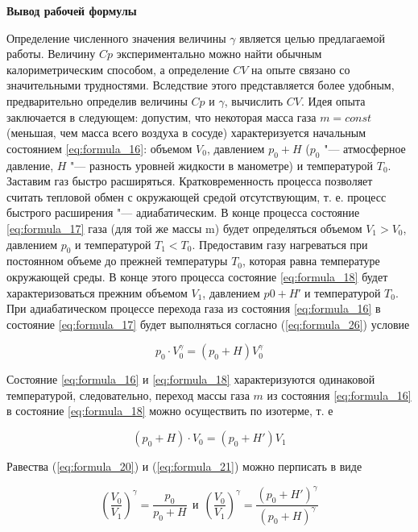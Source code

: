 \begin{center}
    \textbf{Вывод рабочей формулы}
\end{center}

Определение численного значения величины $\gamma$ является целью предлагаемой работы. Величину $Cp$ экспериментально можно найти обычным калориметрическим способом, а определение $CV$ на опыте связано со значительными трудностями. Вследствие этого представляется более удобным, предварительно определив величины $Cp$ и $\gamma$, вычислить $CV$. Идея опыта заключается в следующем: допустим, что некоторая масса газа $m = const$ (меньшая, чем масса всего воздуха в сосуде) характеризуется начальным состоянием \ref{eq:formula_16}: объемом $V_0$, давлением $p_0 + H$ ($p_0$ "--- атмосферное давление, $H$ "--- разность уровней жидкости в манометре) и температурой $T_0$. Заставим газ быстро расширяться. Кратковременность процесса позволяет считать тепловой обмен с окружающей средой отсутствующим, т. е. процесс быстрого расширения "--- адиабатическим. В конце процесса состояние \ref{eq:formula_17} газа (для той же массы m) будет определяться объемом $V_1 > V_0$, давлением $p_0$ и температурой $T_1 < T_0$. Предоставим газу нагреваться при постоянном объеме до прежней температуры $T_0$, которая равна температуре окружающей среды. В конце этого процесса состояние \ref{eq:formula_18} будет характеризоваться прежним объемом $V_1$, давлением $p0 + H$′ и температурой $T_0$. При адиабатическом процессе перехода газа из состояния \ref{eq:formula_16} в состояние \ref{eq:formula_17} будет выполняться согласно (\ref{eq:formula_26}) условие

\begin{equation}
    p_0 \cdot V_0^ \gamma = \left (p_0 +H \right ) V_0^ \gamma
    \label{eq:formula_20}
\end{equation}

Состояние \ref{eq:formula_16} и \ref{eq:formula_18} характеризуются одинаковой температурой, следовательно, переход массы газа $m$ из состояния \ref{eq:formula_16} в состояние \ref{eq:formula_18} можно осуществить по изотерме, т. е

\begin{equation}
    \left (p_0 + H \right ) \cdot V_0 = \left (p_0 +H' \right ) V_1
    \label{eq:formula_21}
\end{equation}

Равества (\ref{eq:formula_20}) и (\ref{eq:formula_21}) можно перписать в виде

\begin{equation}
    \left (\frac{V_0}{V_1} \right )^ \gamma = \frac{p_0}{p_0 + H} 
    ~~ \text{и} ~~ 
    \left (\frac{V_0}{V_1} \right )^ \gamma = \frac{\left (p_0 + H' \right )^ \gamma}{\left (p_0 + H \right )^ \gamma}
    \label{eq:formula_22}
\end{equation}

